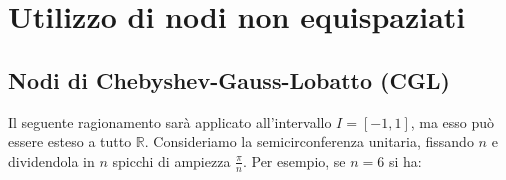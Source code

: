 \section{Utilizzo di nodi non equispaziati}
\subsection{Nodi di Chebyshev-Gauss-Lobatto (CGL)}
Il seguente ragionamento sarà applicato all'intervallo $I=[ -1,1]$, ma esso può essere esteso a tutto $\mathbb{R}$. Consideriamo la semicirconferenza unitaria, fissando $n$ e dividendola in $n$ spicchi di ampiezza $\frac{\pi }{n}$.
Per esempio, se $n=6$ si ha:

\begin{figure}[htpb]
	\centering

	\begin{tikzpicture}[x=0.75pt,y=0.75pt,yscale=-1,xscale=1]


\end{tikzpicture}
\end{figure}
